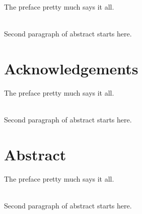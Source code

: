 \documentclass[12pt,oneside]{CSUNthesis}
\renewcommand{\headrulewidth}{0pt} %
\renewcommand{\footrulewidth}{0pt} %
\begin{document}
\singlespacing

\pagestyle{empty} %

\maketitle


\clearpage
\pagestyle{fancy} %
\fancyhf{}
\fancyfoot[C]{\thepage}
\renewcommand{\headrulewidth}{0pt}
\renewcommand{\footrulewidth}{0pt}
\setcounter{page}{2} 

\begin{dedication}
The preface pretty much says it all.\\
\par\\
Second paragraph of abstract starts here.
\end{dedication}

\chapter*{Acknowledgements}
The preface pretty much says it all.\\
\par\\
Second paragraph of abstract starts here.
\clearpage


\hypersetup{linkcolor=black}
\setcounter{tocdepth}{2}
\tableofcontents

\listoftables

\listoffigures

\chapter*{Abstract}
The preface pretty much says it all.\\
\par\\
Second paragraph of abstract starts here.


\mainmatter
\clearpage
\pagestyle{fancy}
\fancyhf{}
\fancyfoot[C]{\thepage}
\renewcommand{\footrulewidth}{0.4pt}
\renewcommand{\headrulewidth}{0pt}
\setcounter{page}{1} %
\end{document}

